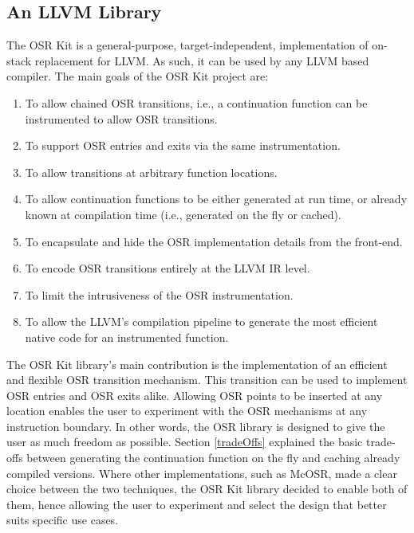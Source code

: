 \subsection{An LLVM Library}

The OSR Kit is a general-purpose, target-independent, implementation of on-stack replacement for LLVM.
As such, it can be used by any LLVM based compiler.
The main goals of the OSR Kit project are:
\begin{enumerate}
    \item To allow chained OSR transitions, i.e., a continuation function can be instrumented to allow OSR transitions.
    \item To support OSR entries and exits via the same instrumentation.
    \item To allow transitions at arbitrary function locations.
    \item To allow continuation functions to be either generated at run time, or already known at compilation time (i.e., generated on the fly or cached).
    \item To encapsulate and hide the OSR implementation details from the front-end.
    \item To encode OSR transitions entirely at the LLVM IR level.
    \item To limit the intrusiveness of the OSR instrumentation.
    \item To allow the LLVM's compilation pipeline to generate the most efficient native code for an instrumented function. \label{llvmTransformPasses}
\end{enumerate}

The OSR Kit library's main contribution is the implementation of an efficient and flexible OSR transition mechanism.
This transition can be used to implement OSR entries and OSR exits alike.
Allowing OSR points to be inserted at any location enables the user to experiment with the OSR mechanisms at any instruction boundary. 
In other words, the OSR library is designed to give the user as much freedom as possible.
Section \ref{tradeOffs} explained the basic trade-offs between generating the continuation function on the fly and caching already compiled versions.
Where other implementations, such as McOSR\cite{lameed2013modular}, made a clear choice between the two techniques, the OSR Kit library decided to enable both of them, hence allowing the user to experiment and select the design that better suits specific use cases.\\

